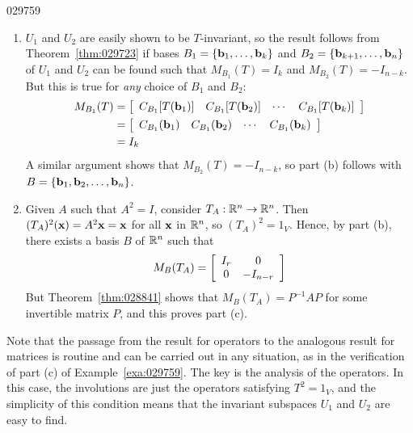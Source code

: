 \begin{example}{}{029759}
\begin{solution}
\begin{enumerate}[label={\alph*.}]
\item $U_{1}$ and $U_{2}$ are easily shown to be $T$-invariant, so the result follows from Theorem~\ref{thm:029723} if bases $B_{1} = \{\textbf{b}_{1}, \dots, \textbf{b}_{k}\}$ and $B_{2} = \{\textbf{b}_{k+1}, \dots, \textbf{b}_{n}\}$ of $U_{1}$ and $U_{2}$ can be found such that $M_{B_1}(T) = I_{k}$ and $M_{B_2}(T) = -I_{n-k}$. But this is true for \textit{any} choice of $B_{1}$ and $B_{2}$:
\begin{align*}
M_{B_1}(T) & = \left[ \begin{array}{cccc} C_{B_1}[T(\textbf{b}_1)] & C_{B_1}[T(\textbf{b}_2)] & \cdots & C_{B_1}[T(\textbf{b}_k)] \end{array} \right] \\
& = \left[ \begin{array}{cccc} C_{B_1}(\textbf{b}_1) & C_{B_1}(\textbf{b}_2) & \cdots & C_{B_1}(\textbf{b}_k) \end{array} \right] \\
& = I_k
\end{align*}
A similar argument shows that $M_{B_2}(T) = -I_{n-k}$, so part (b) follows with $B = \{\textbf{b}_{1}, \textbf{b}_{2}, \dots, \textbf{b}_{n}\}$.

\item Given $A$ such that $A^{2} = I$, consider $T_{A} : \mathbb{R}^n \to \mathbb{R}^n$. Then $(T_{A})^{2}(\textbf{x}) = A^{2}\textbf{x} = \textbf{x}$ for all $\textbf{x}$ in $\mathbb{R}^n$, so $(T_{A})^{2} = 1_{V}$. Hence, by part (b), there exists a basis $B$ of $\mathbb{R}^n$ such that
\begin{equation*}
M_B(T_A) = \left[ \begin{array}{cc} I_r & 0 \\ 0 & -I_{n-r} \end{array} \right]
\end{equation*}
But Theorem~\ref{thm:028841} shows that $M_{B}(T_{A}) = P^{-1}AP$ for some invertible matrix $P$, and this proves part (c).

\end{enumerate}
\end{solution}
\end{example}

\noindent Note that the passage from the result for operators to the analogous result for matrices is routine and can be carried out in any situation, as in the verification of part (c) of Example~\ref{exa:029759}. The key is the analysis of the operators. In this case, the involutions are just the operators satisfying $T^{2} = 1_{V}$, and the simplicity of this condition means that the invariant subspaces $U_{1}$ and $U_{2}$ are easy to find.


